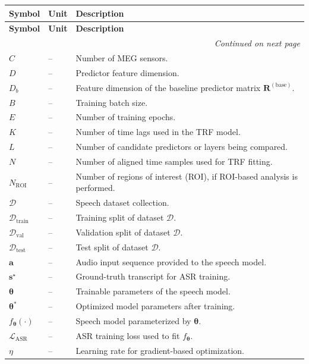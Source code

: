 \documentclass[12pt, titlepage]{article}
\begin{document}
\renewcommand{\arraystretch}{1.15}
\noindent
\begin{longtable}{l l p{11.0cm}}
\toprule
\textbf{Symbol} & \textbf{Unit} & \textbf{Description}\\
\midrule
\endfirsthead

\toprule
\textbf{Symbol} & \textbf{Unit} & \textbf{Description}\\
\midrule
\endhead

\midrule
\multicolumn{3}{r}{\emph{Continued on next page}}\\
\endfoot

\bottomrule
\endlastfoot

$C$ & -- & Number of MEG sensors.\\
$D$ & -- & Predictor feature dimension.\\
$D_b$ & -- & Feature dimension of the baseline predictor matrix $\mathbf{R}^{(\mathrm{base})}$.\\
$B$ & -- & Training batch size.\\
$E$ & -- & Number of training epochs.\\
$K$ & -- & Number of time lags used in the TRF model.\\
$L$ & -- & Number of candidate predictors or layers being compared.\\
$N$ & -- & Number of aligned time samples used for TRF fitting.\\
$N_{\mathrm{ROI}}$ & -- & Number of regions of interest (ROI), if ROI-based analysis is performed.\\

$\mathcal{D}$ & -- & Speech dataset collection.\\
$\mathcal{D}_{\mathrm{train}}$ & -- & Training split of dataset $\mathcal{D}$.\\
$\mathcal{D}_{\mathrm{val}}$ & -- & Validation split of dataset $\mathcal{D}$.\\
$\mathcal{D}_{\mathrm{test}}$ & -- & Test split of dataset $\mathcal{D}$.\\

$\boldsymbol{a}$ & -- & Audio input sequence provided to the speech model.\\
$\boldsymbol{s}^{\star}$ & -- & Ground-truth transcript for ASR training.\\
$\boldsymbol{\theta}$ & -- & Trainable parameters of the speech model.\\
$\boldsymbol{\theta}^{\ast}$ & -- & Optimized model parameters after training.\\
$f_{\boldsymbol{\theta}}(\cdot)$ & -- & Speech model parameterized by $\boldsymbol{\theta}$.\\
$\mathcal{L}_{\mathrm{ASR}}$ & -- & ASR training loss used to fit $f_{\boldsymbol{\theta}}$.\\
$\eta$ & -- & Learning rate for gradient-based optimization.\\


\end{longtable}
\end{document}
